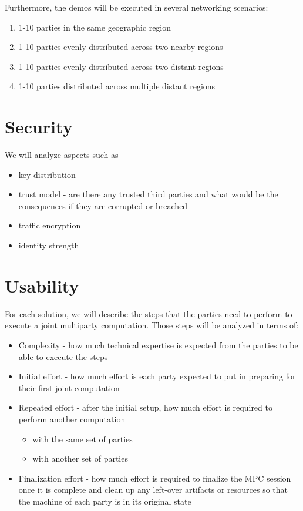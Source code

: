 Furthermore, the demos will be executed in several networking scenarios:

\begin{enumerate}
\def\labelenumi{\arabic{enumi}.}
\tightlist
\item
  1-10 parties in the same geographic region
\item
  1-10 parties evenly distributed across two nearby regions
\item
  1-10 parties evenly distributed across two distant regions
\item
  1-10 parties distributed across multiple distant regions
\end{enumerate}

\hypertarget{thesis__030-methods.md__security}{%
\section{Security}\label{thesis__030-methods.md__security}}

We will analyze aspects such as

\begin{itemize}
\tightlist
\item
  key distribution
\item
  trust model - are there any trusted third parties and what would be
  the consequences if they are corrupted or breached
\item
  traffic encryption
\item
  identity strength
\end{itemize}

\hypertarget{thesis__030-methods.md__usability}{%
\section{Usability}\label{thesis__030-methods.md__usability}}

For each solution, we will describe the steps that the parties need to
perform to execute a joint multiparty computation. Those steps will be
analyzed in terms of:

\begin{itemize}
\tightlist
\item
  Complexity - how much technical expertise is expected from the parties
  to be able to execute the steps
\item
  Initial effort - how much effort is each party expected to put in
  preparing for their first joint computation
\item
  Repeated effort - after the initial setup, how much effort is required
  to perform another computation

  \begin{itemize}
  \tightlist
  \item
    with the same set of parties
  \item
    with another set of parties
  \end{itemize}
\item
  Finalization effort - how much effort is required to finalize the MPC
  session once it is complete and clean up any left-over artifacts or
  resources so that the machine of each party is in its original state
\end{itemize}

